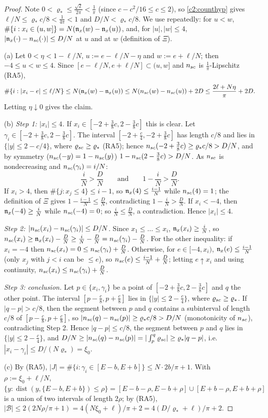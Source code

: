 \begin{proof}
Note $0<\varrho_*\le\frac{\sqrt2}{2\pi}<\frac1\pi$ (since $c-c^2/16\le c\le2$), so \eqref{c2:counthyp} gives $\ell/N\le\varrho_*c/8<\frac1{4\pi}<1$ and $D/N<\varrho_*c/8$.
We use repeatedly: for $u<w$, $\#\{i:x_i\in(u,w]\}=N(\mathfrak{n}_x(w)-\mathfrak{n}_x(u))$, and, for $|u|,|w|\le4$, $|\mathfrak{n}_x(\cdot)-n_{sc}(\cdot)|\le D/N$ at $u$ and at $w$ (definition of $\Xi$).

(a) Let $0<\eta<1-\ell/N$, $u:=e-\ell/N-\eta$ and $w:=e+\ell/N$; then $-4\le u<w\le4$. Since $[e-\ell/N,e+\ell/N]\subset(u,w]$ and $n_{sc}$ is $\frac1\pi$-Lipschitz (RA5),
\[
\#\{i:|x_i-e|\le\ell/N\}\le N(\mathfrak{n}_x(w)-\mathfrak{n}_x(u))\le N(n_{sc}(w)-n_{sc}(u))+2D\le\frac{2\ell+N\eta}{\pi}+2D .
\]
Letting $\eta\downarrow0$ gives the claim.

(b) \emph{Step 1: $|x_i|\le4$.} If $x_i\in[-2+\frac38c,2-\frac38c]$ this is clear. Let $\gamma_i\in[-2+\frac38c,2-\frac38c]$. The interval $[-2+\frac c4,-2+\frac38c]$ has length $c/8$ and lies in $\{|y|\le2-c/4\}$, where $\varrho_{sc}\ge\varrho_*$ (RA5); hence
$n_{sc}(-2+\frac38c)\ge\varrho_*c/8>D/N$, and by symmetry ($n_{sc}(-y)=1-n_{sc}(y)$) $1-n_{sc}(2-\frac38c)>D/N$. As $n_{sc}$ is nondecreasing and $n_{sc}(\gamma_i)=i/N$:
\[
\frac iN>\frac DN\qquad\text{and}\qquad1-\frac iN>\frac DN .
\]
If $x_i>4$, then $\#\{j:x_j\le4\}\le i-1$, so $\mathfrak{n}_x(4)\le\frac{i-1}N$ while $n_{sc}(4)=1$; the definition of $\Xi$ gives $1-\frac{i-1}N\le\frac DN$, contradicting $1-\frac iN>\frac DN$.
If $x_i<-4$, then $\mathfrak{n}_x(-4)\ge\frac iN$ while $n_{sc}(-4)=0$; so $\frac iN\le\frac DN$, a contradiction. Hence $|x_i|\le4$.

\emph{Step 2: $|n_{sc}(x_i)-n_{sc}(\gamma_i)|\le D/N$.} Since $x_1\le\dots\le x_i$, $\mathfrak{n}_x(x_i)\ge\frac iN$, so $n_{sc}(x_i)\ge\mathfrak{n}_x(x_i)-\frac DN\ge\frac iN-\frac DN=n_{sc}(\gamma_i)-\frac DN$.
For the other inequality: if $x_i=-4$ then $n_{sc}(x_i)=0\le n_{sc}(\gamma_i)+\frac DN$. Otherwise, for $e\in[-4,x_i)$, $\mathfrak{n}_x(e)\le\frac{i-1}N$ (only $x_j$ with $j<i$ can be $\le e$), so $n_{sc}(e)\le\frac{i-1}N+\frac DN$; letting $e\uparrow x_i$ and using continuity, $n_{sc}(x_i)\le n_{sc}(\gamma_i)+\frac DN$.

\emph{Step 3: conclusion.} Let $p\in\{x_i,\gamma_i\}$ be a point of $[-2+\frac38c,2-\frac38c]$ and $q$ the other point. The interval $[p-\frac c8,p+\frac c8]$ lies in $\{|y|\le2-\frac c4\}$, where $\varrho_{sc}\ge\varrho_*$.
If $|q-p|>c/8$, then the segment between $p$ and $q$ contains a subinterval of length $c/8$ of $[p-\frac c8,p+\frac c8]$, so $|n_{sc}(q)-n_{sc}(p)|\ge\varrho_*c/8>D/N$ (monotonicity of $n_{sc}$), contradicting Step 2.
Hence $|q-p|\le c/8$, the segment between $p$ and $q$ lies in $\{|y|\le2-\frac c4\}$, and $D/N\ge|n_{sc}(q)-n_{sc}(p)|=|\int_p^q\varrho_{sc}|\ge\varrho_*|q-p|$, i.e.\ $|x_i-\gamma_i|\le D/(N\varrho_*)=\xi_0$.

(c) By (RA5), $|J|=\#\{i:\gamma_i\in[E-b,E+b]\}\le N\cdot2b/\pi+1$. With $\rho:=\xi_0+\ell/N$, $\{y:\operatorname{dist}(y,\{E-b,E+b\})\le\rho\}=[E-b-\rho,E-b+\rho]\cup[E+b-\rho,E+b+\rho]$ is a union of two intervals of length $2\rho$; by (RA5),
$|\mathcal B|\le2(2N\rho/\pi+1)=4(N\xi_0+\ell)/\pi+2=4(D/\varrho_*+\ell)/\pi+2$.
\end{proof}

